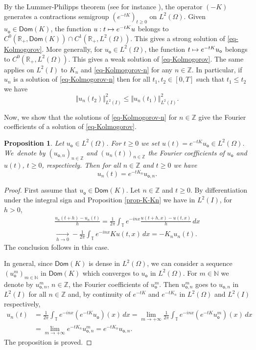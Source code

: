 \documentclass[JEP,XML,SOM,Unicode]{cedram}
\def\mto{\mathchoice{\longmapsto}{\mapsto}{\mapsto}{\mapsto}}
\theoremstyle{plain}
\newtheorem{proposition}[theorem]{Proposition}
\theoremstyle{definition}
\newcommand {\limt}[2]{\xrightarrow[#1 \to #2]{}}
\newcommand{\nr}[1]{\Vert #1\Vert}
\newcommand{\1}{\mathds 1}
\newcommand{\Dom}{\mathsf{Dom}}
\newcommand{\R}{\mathbb{R}}
\newcommand{\N}{\mathbb{N}}
\newcommand{\Z}{\mathbb{Z}}
\newcommand{\T}{\mathbb{T}}
\let\O\Omega
\newcommand{\uo}{u_{\mathsf{o}}}
\newcommand{\uon}{u_{\mathsf{o},n}}
\begin{document}
By the Lummer-Philipps theorem (see for instance \cite{engel}), the operator $(-K)$ generates a contractions semigroup $(e^{-tK})_{t \geq 0}$ on $L^2(\O)$. Given $\uo \in \Dom(K)$, the function $u : t \mto e^{-tK} u$ belongs to $C^0(\R_+,\Dom(K)) \cap C^1(\R_+,L^2(\O))$. This gives a strong solution of \eqref{eq-Kolmogorov}. More generally, for $\uo \in L^2(\O)$, the function $t \mto e^{-tK} \uo$ belongs to $C^0(\R_+,L^2(\O))$. This gives a weak solution of \eqref{eq-Kolmogorov}. The same applies on $L^2(I)$ to $K_n$ and \eqref{eq-Kolmogorov-n} for any $n \in \Z$. In particular, if $u_n$ is a solution of \eqref{eq-Kolmogorov-n} then for all $t_1,t_2 \in [0,T]$ such that $t_1 \leq t_2$ we have
\begin{equation} \label{eq-semigroup-contraction}
\nr{u_n(t_2)}_{L^2(I)}^2 \leq \nr{u_n(t_1)}_{L^2(I)}^2.
\end{equation}

Now, we show that the solutions of \eqref{eq-Kolmogorov-n} for $n \in \Z$ give the Fourier coefficients of a solution of \eqref{eq-Kolmogorov}.

\begin{proposition} \label{prop-Fourier-propagateurs}
Let $\uo \in L^2(\O)$. For $t \geq 0$ we set $u(t) = e^{-tK} \uo \in L^2(\O)$. We~denote by $(\uon)_{n \in \Z}$ and $(u_n(t))_{n \in \Z}$ the Fourier coefficients of $\uo$ and $u(t)$, $t \geq 0$, respectively. Then for all $n \in \Z$ and $t \geq 0$ we have
\[
u_n(t) = e^{-t K_n} \uon.
\]
\end{proposition}

\begin{proof}
First assume that $\uo \in \Dom(K)$. Let $n \in \Z$ and $t \geq 0$. By differentiation under the integral sign and Proposition \ref{prop-K-Kn} we have in $L^2(I)$, for $h > 0$,
\begin{multline*}
\frac {u_n(t+h) - u_n(t)} h = \frac 1 {2\pi} \int_\T e^{-inx} \frac {u(t+h,x) - u(t,x)} h \, dx\\
\limt h 0 - \frac 1 {2\pi} \int_\T e^{-inx} K u(t,x) \, dx = -K_n u_n(t).
\end{multline*}
The conclusion follows in this case.

In general, since $\Dom(K)$ is dense in $L^2(\O)$, we can consider a sequence $(u_{\mathsf{o}}^m)_{m \in \N}$ in $\Dom(K)$ which converges to $\uo$ in $L^2(\O)$. For $m \in \N$ we denote by $u_{\mathsf{o},n}^m$, $n \in \Z$, the Fourier coefficients of $u_{\mathsf{o}}^m$. Then $u_{\mathsf{o},n}^m$ goes to $u_{\mathsf{o},n}$ in $L^2(I)$ for all $n \in \Z$ and, by continuity of $e^{-tK}$ and $e^{-tK_n}$ in $L^2(\O)$ and $L^2(I)$ respectively,
\begin{align*}
u_n(t)
& = \frac 1 {2\pi} \int_\T e^{-inx} (e^{-tK} \uo)(x) \,dx = \lim_{m \to +\infty} \frac 1 {2\pi} \int_\T e^{-inx} (e^{-tK} u_{\mathsf{o}}^m)(x) \,dx\\
& = \lim_{m \to +\infty} e^{-tK_n} u_{\mathsf{o},n}^m = e^{-tK_n} \uon.
\end{align*}
The proposition is proved.
\end{proof}
\end{document}
